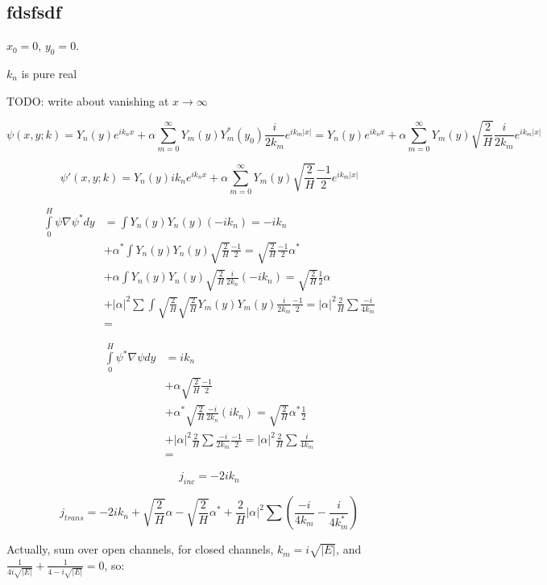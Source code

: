\documentclass[12pt, a4paper]{article}
\begin{document}
\subsection{fdsfsdf}
$x_0 = 0$, $y_0 = 0$.

$k_n$ is pure real


TODO: write about vanishing at $x \to \infty$

$$\psi(x, y; k) = Y_n(y) e^{i k_n x} + \alpha \sum\limits_{m = 0}^\infty Y_m(y) Y_m^*(y_0) \frac{i}{2 k_m} e^{i k_m |x|} = Y_n(y) e^{i k_n x} + \alpha \sum\limits_{m = 0}^\infty Y_m(y) \sqrt{\frac{2}{H}} \frac{i}{2 k_m} e^{i k_m |x|} $$

$$\psi'(x, y; k) = Y_n(y) i k_n e^{i k_n x} + \alpha \sum\limits_{m = 0}^\infty Y_m(y) \sqrt{\frac{2}{H}} \frac{-1}{2 } e^{i k_m |x|}$$


\begin{align*}
\int\limits_{0}^H \psi \nabla \psi^* dy &= \int Y_n(y) Y_n(y) (-i k_n) = -i k_n \\
&+ \alpha^* \int Y_n(y) Y_n(y) \sqrt{\frac{2}{H}} \frac{-1}{2}  = \sqrt{\frac{2}{H}}\frac{-1}{2} \alpha^* \\
&+ \alpha \int Y_n(y) Y_n(y) \sqrt{\frac{2}{H}} \frac{i}{2k_n}(-i k_n) =  \sqrt{\frac{2}{H}}\frac{1}{2} \alpha \\
&+ |\alpha|^2 \sum \int \sqrt{\frac{2}{H}} \sqrt{\frac{2}{H}} Y_m(y) Y_m(y) \frac{i}{2 k_m} \frac{-1}{2} = |\alpha|^2 \frac{2}{H} \sum \frac{-i}{4 k_m} \\
&= %
\end{align*}

\begin{align*}
\int\limits_{0}^H \psi^* \nabla \psi dy &=
   i k_n \\
&+ \alpha \sqrt{\frac{2}{H}} \frac{-1}{2} \\
&+ \alpha^* \sqrt{\frac{2}{H}} \frac{-i}{2 k_n} (i k_n) = \sqrt{\frac{2}{H}} \alpha^* \frac{1}{2} \\
&+ |\alpha|^2 \frac{2}{H} \sum \frac{-i}{2 k_m} \frac{-1}{2} = |\alpha|^2 \frac{2}{H} \sum \frac{i}{4 k_m} \\
&= %
\end{align*}

$$j_{inc} = - 2 i k_n$$

$$j_{trans} = - 2 i k_n + \sqrt{\frac{2}{H}} \alpha - \sqrt{\frac{2}{H}} \alpha^* + \frac{2}{H}|\alpha|^2 \sum (\frac{-i}{4 k_m} - \frac{i}{4 k_m^*})$$

Actually, sum over open channels, for closed channels, $k_m = i \sqrt{|E|}$, and $\frac{1}{4 i \sqrt{|E|}} + \frac{1}{4 -i \sqrt{|E|}} = 0$, so:
\end{document}
